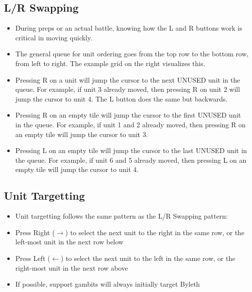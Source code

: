 \subsection*{L/R Swapping}
\begin{itemize}
\item During preps or an actual battle, knowing how the L and R buttons work is critical in moving quickly.
\item The general queue for unit ordering goes from the top row to the bottom row, from left to right. The example grid on the right visualizes this.
\item Pressing R on a unit will jump the cursor to the next UNUSED unit in the queue. For example, if unit 3 already moved, then pressing R on unit 2 will jump the cursor to unit 4. The L button does the same but backwards.
\item Pressing R on an empty tile will jump the cursor to the first UNUSED unit in the queue. For example, if unit 1 and 2 already moved, then pressing R on an empty tile will jump the cursor to unit 3.
\item Pressing L on an empty tile will jump the cursor to the last UNUSED unit in the queue. For example, if unit 6 and 5 already moved, then pressing L on an empty tile will jump the cursor to unit 4.
\end{itemize}


\subsection*{Unit Targetting}
\begin{itemize}
\item Unit targetting follows the same pattern as the L/R Swapping pattern:
\item Press Right ($\rightarrow$) to select the next unit to the right in the same row, or the left-most unit in the next row below
\item Press Left ($\leftarrow$) to select the next unit to the left in the same row, or the right-most unit in the next row above
\item If possible, support gambits will always initially target Byleth
\end{itemize}